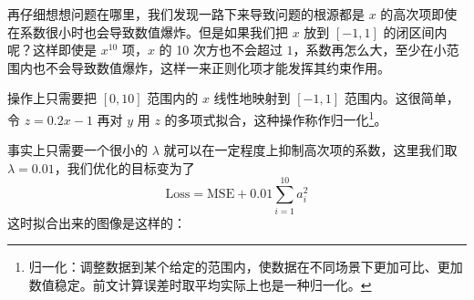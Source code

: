 \documentclass[UTF8, 12pt]{article}
\begin{document}
再仔细想想问题在哪里，我们发现一路下来导致问题的根源都是 $x$ 的高次项即使在系数很小时也会导致数值爆炸。但是如果我们把 $x$ 放到 $[-1, 1]$ 的闭区间内呢？这样即使是 $x^{10}$ 项，$x$ 的 10 次方也不会超过 $1$，系数再怎么大，至少在小范围内也不会导致数值爆炸，这样一来正则化项才能发挥其约束作用。

操作上只需要把 $[0, 10]$ 范围内的 $x$ 线性地映射到 $[-1, 1]$ 范围内。这很简单，令 $z = 0.2 x - 1$ 再对 $y$ 用 $z$ 的多项式拟合，这种操作称作归一化\footnote{归一化：调整数据到某个给定的范围内，使数据在不同场景下更加可比、更加数值稳定。前文计算误差时取平均实际上也是一种归一化。}。

事实上只需要一个很小的 $\lambda$ 就可以在一定程度上抑制高次项的系数，这里我们取 $\lambda = 0.01$，我们优化的目标变为了
\[
    \text{Loss} = \text{MSE} + 0.01 \sum_{i=1}^{10} a_i^2
\]
这时拟合出来的图像是这样的：
\end{document}

